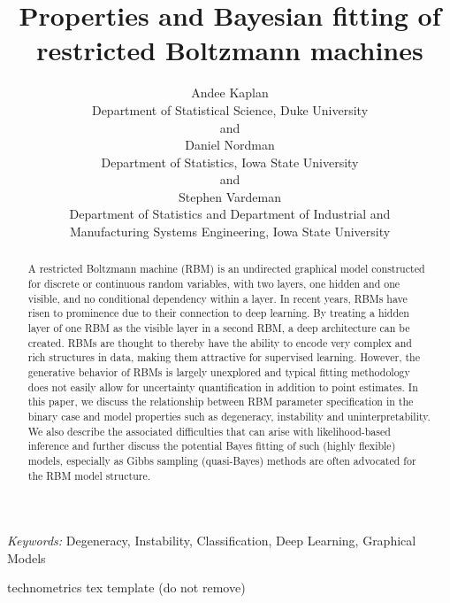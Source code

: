 \documentclass[]{article}
\theoremstyle{definition}
\begin{document}
\def\spacingset#1{\renewcommand{\baselinestretch}%
{#1}\small\normalsize} \spacingset{1}

\title{\bf Properties and Bayesian fitting of restricted Boltzmann machines}
\author{Andee Kaplan \\ Department of Statistical Science, Duke University \\  and \\ Daniel Nordman \\ Department of Statistics, Iowa State University \\  and \\ Stephen Vardeman \\ Department of Statistics and Department of Industrial and\\
Manufacturing Systems Engineering, Iowa State University \\ }

\maketitle
\begin{abstract}
A restricted Boltzmann machine (RBM) is an undirected graphical model
constructed for discrete or continuous random variables, with two
layers, one hidden and one visible, and no conditional dependency within
a layer. In recent years, RBMs have risen to prominence due to their
connection to deep learning. By treating a hidden layer of one RBM as
the visible layer in a second RBM, a deep architecture can be created.
RBMs are thought to thereby have the ability to encode very complex and
rich structures in data, making them attractive for supervised learning.
However, the generative behavior of RBMs is largely unexplored and
typical fitting methodology does not easily allow for uncertainty
quantification in addition to point estimates. In this paper, we discuss
the relationship between RBM parameter specification in the binary case
and model properties such as degeneracy, instability and
uninterpretability. We also describe the associated difficulties that
can arise with likelihood-based inference and further discuss the
potential Bayes fitting of such (highly flexible) models, especially as
Gibbs sampling (quasi-Bayes) methods are often advocated for the RBM
model structure.
\end{abstract}
\noindent%
{\it Keywords:}  Degeneracy, Instability, Classification, Deep Learning, Graphical Models
\vfill

\hfill {\tiny technometrics tex template (do not remove)}
\newpage
\spacingset{1.45} %
\end{document}
